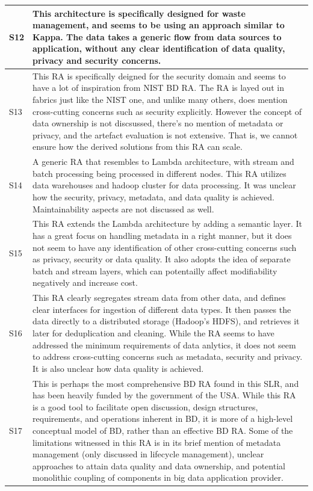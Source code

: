 \documentclass{ieeeaccess}
\begin{document}
\begin{table}
\begin{tabular}{|p{0.3cm}|p{16.8cm}|}
        \hline
        S12 & This architecture is specifically designed for waste management, and seems to be using an approach similar to Kappa. The data takes a generic flow from data sources to application, without any clear identification of data quality, privacy and security concerns.    \\
        \hline
        S13 & This RA is specifically deigned for the security domain and seems to have a lot of inspiration from NIST BD RA. The RA is layed out in fabrics just like the NIST one, and unlike many others, does mention cross-cutting concerns such as security explicitly. However the concept of data ownership is not discsussed, there's no mention of metadata or privacy, and the artefact evaluation is not extensive. That is, we cannot ensure how the derived solutions from this RA can scale.    \\
        \hline
        S14 & A generic RA that resembles to Lambda architecture, with stream and batch processing being processed in different nodes. This RA utilizes data warehouses and hadoop cluster for data processing. It was unclear how the security, privacy, metadata, and data quality is achieved. Maintainability aspects are not discussed as well. \\
        \hline
        S15 & This RA extends the Lambda architecture by adding a semantic layer. It has a great focus on handling metadata in a right manner, but it does not seem to have any identification of other cross-cutting concerns such as privacy, security or data quality. It also adopts the idea of separate batch and stream layers, which can potentailly affect modifiability negatively and increase cost. \\
        \hline
        S16 & This RA clearly segregates stream data from other data, and defines clear interfaces for ingestion of different data types. It then passes the data directly to a distributed storage (Hadoop's HDFS), and retrieves it later for deduplication and cleaning. While the RA seems to have addressed the minimum requirements of data anlytics, it does not seem to address cross-cutting concerns such as metadata, security and privacy. It is also unclear how data quality is achieved. \\
        \hline
        S17 & This is perhaps the most comprehensive BD RA found in this SLR, and has been heavily funded by the government of the USA. While this RA is a good tool to facilitate open discussion, design structures, requirements, and operations inherent in BD, it is more of a high-level conceptual model of BD, rather than an effective BD RA. Some of the limitations witnessed in this RA is in its brief mention of metadata management (only discussed in lifecycle management), unclear approaches to attain data quality and data ownership, and potential monolithic coupling of components in big data application provider. \\

\end{tabular}
\end{table}
\end{document}
